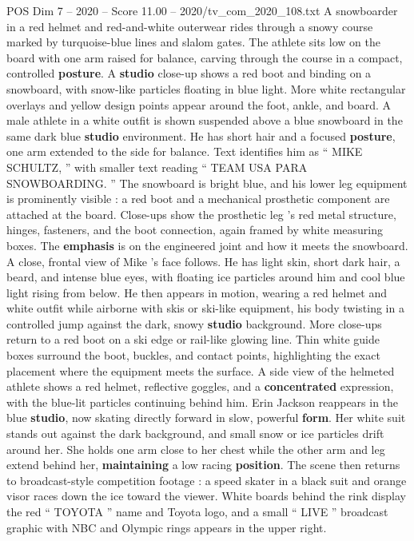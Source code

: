 \begin{textsample}{POS Dim 7 – 2020 – Score 11.00 – 2020/tv\_com\_2020\_108.txt}
A snowboarder in a red helmet and red-and-white outerwear rides through a snowy course marked by turquoise-blue lines and slalom gates.
The athlete sits low on the board with one arm raised for balance, carving through the course in a compact, controlled \textbf{posture}.
A \textbf{studio} close-up shows a red boot and binding on a snowboard, with snow-like particles floating in blue light.
More white rectangular overlays and yellow design points appear around the foot, ankle, and board.
A male athlete in a white outfit is shown suspended above a blue snowboard in the same dark blue \textbf{studio} environment.
He has short hair and a focused \textbf{posture}, one arm extended to the side for balance.
Text identifies him as “ MIKE SCHULTZ, ” with smaller text reading “ TEAM USA PARA SNOWBOARDING. ” The snowboard is bright blue, and his lower leg equipment is prominently visible : a red boot and a mechanical prosthetic component are attached at the board.
Close-ups show the prosthetic leg ’s red metal structure, hinges, fasteners, and the boot connection, again framed by white measuring boxes.
The \textbf{emphasis} is on the engineered joint and how it meets the snowboard.
A close, frontal view of Mike ’s face follows.
He has light skin, short dark hair, a beard, and intense blue eyes, with floating ice particles around him and cool blue light rising from below.
He then appears in motion, wearing a red helmet and white outfit while airborne with skis or ski-like equipment, his body twisting in a controlled jump against the dark, snowy \textbf{studio} background.
More close-ups return to a red boot on a ski edge or rail-like glowing line.
Thin white guide boxes surround the boot, buckles, and contact points, highlighting the exact placement where the equipment meets the surface.
A side view of the helmeted athlete shows a red helmet, reflective goggles, and a \textbf{concentrated} expression, with the blue-lit particles continuing behind him.
Erin Jackson reappears in the blue \textbf{studio}, now skating directly forward in slow, powerful \textbf{form}.
Her white suit stands out against the dark background, and small snow or ice particles drift around her.
She holds one arm close to her chest while the other arm and leg extend behind her, \textbf{maintaining} a low racing \textbf{position}.
The scene then returns to broadcast-style competition footage : a speed skater in a black suit and orange visor races down the ice toward the viewer.
White boards behind the rink display the red “ TOYOTA ” name and Toyota logo, and a small “ LIVE ” broadcast graphic with NBC and Olympic rings appears in the upper right.

\end{textsample}
